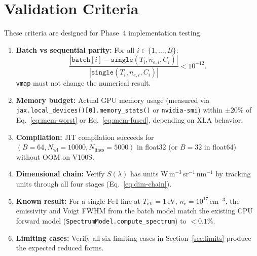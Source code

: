 \documentclass[11pt]{article}
\newcommand{\TeV}{T_\mathrm{eV}}
\newcommand{\ne}{n_\mathrm{e}}
\begin{document}
\section{Validation Criteria}
\label{sec:validation}

These criteria are designed for Phase~4 implementation testing.

\begin{enumerate}
  \item \textbf{Batch vs sequential parity:}
    For all $i \in \{1, \ldots, B\}$:
    \begin{equation}
      \frac{|\texttt{batch}[i] - \texttt{single}(T_i, n_{e,i}, C_i)|}
           {|\texttt{single}(T_i, n_{e,i}, C_i)|} < 10^{-12}.
    \end{equation}
    \texttt{vmap} must not change the numerical result.

  \item \textbf{Memory budget:}
    Actual GPU memory usage (measured via \texttt{jax.local\_devices()[0].memory\_stats()}
    or \texttt{nvidia-smi}) within $\pm 20\%$ of Eq.~\eqref{eq:mem-worst} or
    Eq.~\eqref{eq:mem-fused}, depending on XLA behavior.

  \item \textbf{Compilation:}
    JIT compilation succeeds for $(B=64, N_\mathrm{wl}=10000, N_\mathrm{lines}=5000)$
    in float32 (or $B=32$ in float64) without OOM on V100S.

  \item \textbf{Dimensional chain:}
    Verify $S(\lambda)$ has units W\,m$^{-3}$\,sr$^{-1}$\,nm$^{-1}$
    by tracking units through all four stages
    (Eq.~\ref{eq:dim-chain}).

  \item \textbf{Known result:}
    For a single Fe\,I line at $\TeV = 1$\,eV, $\ne = 10^{17}$\,cm$^{-3}$,
    the emissivity and Voigt FWHM from the batch model match the existing
    CPU forward model (\texttt{SpectrumModel.compute\_spectrum}) to $< 0.1\%$.

  \item \textbf{Limiting cases:}
    Verify all six limiting cases in Section~\ref{sec:limits} produce
    the expected reduced forms.
\end{enumerate}
\end{document}

